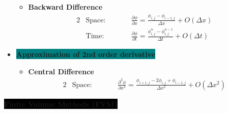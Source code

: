 \begin{itemize}
\begin{itemize}
        \item \textbf{\color{red}Backward Difference}
        \begin{alignat*}{2}
            &\text{Space:} \qquad && \frac{\partial \phi}{\partial x} = \frac{\phi_{i,j}-\phi_{i-1,j}}{\Delta x} + O(\Delta x) \\
            &\text{Time:} \qquad && \frac{\partial \phi}{\partial t} = \frac{\phi_{i,j}^{n}-\phi_{i,j}^{n-1}}{\Delta t} + O(\Delta t)
        \end{alignat*}
    \end{itemize}
    \item \colorbox{teal}{\textbf{\color{white}Approximation of 2nd order derivative}}
    \begin{itemize}
        \item \textbf{\color{red}Central Difference}
        \begin{alignat*}{2}
            &\text{Space:} \qquad && \frac{\partial^2 \phi}{\partial x^2} = \frac{\phi_{i+1,j}-2\phi_{i,j}+\phi_{i-1,j}}{\Delta x^2} + O(\Delta x^2)
        \end{alignat*}
    \end{itemize}
\end{itemize}

\colorbox{black}{\textbf{\color{white}Finite Volume Methods (FVM)}}

